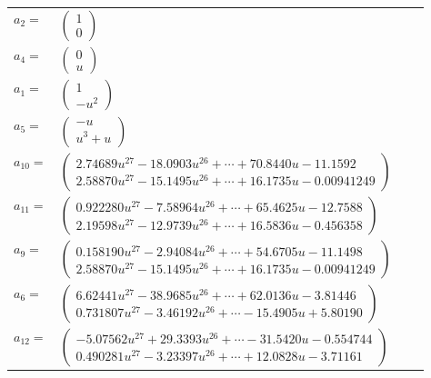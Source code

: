 \documentclass[1p]{elsarticle_modified}
\theoremstyle{definition}
\begin{document}
\begin{tabular}{m{7pt} m{180pt} m{7pt} m{180pt} }
\flushright $a_{2}=$&$\begin{pmatrix}1\\0\end{pmatrix}$ \\
\flushright $a_{4}=$&$\begin{pmatrix}0\\u\end{pmatrix}$ \\
\flushright $a_{1}=$&$\begin{pmatrix}1\\- u^2\end{pmatrix}$ \\
\flushright $a_{5}=$&$\begin{pmatrix}- u\\u^3+u\end{pmatrix}$ \\
\flushright $a_{10}=$&$\begin{pmatrix}2.74689 u^{27}-18.0903 u^{26}+\cdots+70.8440 u-11.1592\\2.58870 u^{27}-15.1495 u^{26}+\cdots+16.1735 u-0.00941249\end{pmatrix}$ \\
\flushright $a_{11}=$&$\begin{pmatrix}0.922280 u^{27}-7.58964 u^{26}+\cdots+65.4625 u-12.7588\\2.19598 u^{27}-12.9739 u^{26}+\cdots+16.5836 u-0.456358\end{pmatrix}$ \\
\flushright $a_{9}=$&$\begin{pmatrix}0.158190 u^{27}-2.94084 u^{26}+\cdots+54.6705 u-11.1498\\2.58870 u^{27}-15.1495 u^{26}+\cdots+16.1735 u-0.00941249\end{pmatrix}$ \\
\flushright $a_{6}=$&$\begin{pmatrix}6.62441 u^{27}-38.9685 u^{26}+\cdots+62.0136 u-3.81446\\0.731807 u^{27}-3.46192 u^{26}+\cdots-15.4905 u+5.80190\end{pmatrix}$ \\
\flushright $a_{12}=$&$\begin{pmatrix}-5.07562 u^{27}+29.3393 u^{26}+\cdots-31.5420 u-0.554744\\0.490281 u^{27}-3.23397 u^{26}+\cdots+12.0828 u-3.71161\end{pmatrix}$ \\

\end{tabular}
\end{document}
